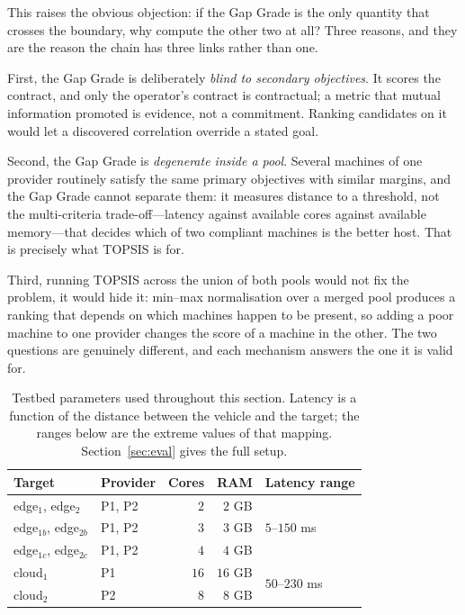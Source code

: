 \documentclass[conference]{IEEEtran}
\begin{document}
This raises the obvious objection: if the Gap Grade is the only quantity that
crosses the boundary, why compute the other two at all? Three reasons, and
they are the reason the chain has three links rather than one.

First, the Gap Grade is deliberately \emph{blind to secondary objectives}. It
scores the contract, and only the operator's contract is contractual; a
metric that mutual information promoted is evidence, not a commitment. Ranking
candidates on it would let a discovered correlation override a stated goal.

Second, the Gap Grade is \emph{degenerate inside a pool}. Several machines of
one provider routinely satisfy the same primary objectives with similar
margins, and the Gap Grade cannot separate them: it measures distance to a
threshold, not the multi-criteria trade-off---latency against available cores
against available memory---that decides which of two compliant machines is the
better host. That is precisely what TOPSIS is for.

Third, running TOPSIS across the union of both pools would not fix the
problem, it would hide it: min--max normalisation over a merged pool produces
a ranking that depends on which machines happen to be present, so adding a
poor machine to one provider changes the score of a machine in the other. The
two questions are genuinely different, and each mechanism answers the one it
is valid for.

\begin{table}[t]
\centering
\caption{Testbed parameters used throughout this section. Latency is a
function of the distance between the vehicle and the target; the ranges below
are the extreme values of that mapping. Section~\ref{sec:eval} gives the full
setup.}
\label{tab:testbed-preview}
\footnotesize
\setlength{\tabcolsep}{4pt}
\begin{tabular}{@{}llrrl@{}}
\toprule
\textbf{Target} & \textbf{Provider} & \textbf{Cores} & \textbf{RAM}
& \textbf{Latency range}\\
\midrule
edge$_1$, edge$_2$       & P1, P2 & $2$  & $2$ GB  & \multirow{3}{*}{$5$--$150$ ms}\\
edge$_{1b}$, edge$_{2b}$ & P1, P2 & $3$  & $3$ GB  & \\
edge$_{1c}$, edge$_{2c}$ & P1, P2 & $4$  & $4$ GB  & \\
\addlinespace[2pt]
cloud$_1$                & P1     & $16$ & $16$ GB & \multirow{2}{*}{$50$--$230$ ms}\\
cloud$_2$                & P2     & $8$  & $8$ GB  & \\
\bottomrule
\end{tabular}
\end{table}
\end{document}
